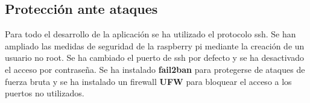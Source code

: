 \subsection{Protección ante ataques}

Para todo el desarrollo de la aplicación se ha utilizado el protocolo ssh.
Se han ampliado las medidas de seguridad de la raspberry pi mediante la creación de un usuario no root. Se ha cambiado el puerto de ssh por defecto y se ha desactivado el acceso por contraseña. Se ha instalado \textbf{fail2ban} para protegerse de ataques de fuerza bruta y se ha instalado un firewall \textbf{UFW} para bloquear el acceso a los puertos no utilizados. 